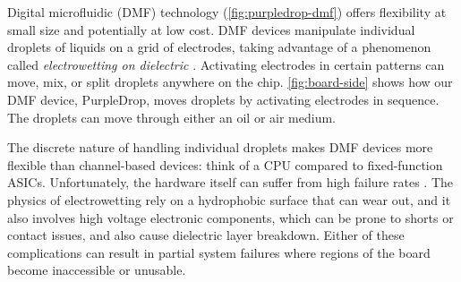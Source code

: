 \documentclass[sigconf, screen]{acmart}
\begin{document}
Digital microfluidic (DMF) technology (\autoref{fig:purpledrop-dmf}) offers flexibility at small size and potentially at low cost.
DMF devices manipulate individual droplets of liquids on a grid of electrodes, taking advantage of a phenomenon called \emph{electrowetting on dielectric} \cite{pollack2000electrowetting}.
Activating electrodes in certain patterns can move, mix, or split droplets anywhere on the chip.
\autoref{fig:board-side} shows how our DMF device, PurpleDrop, moves droplets by activating electrodes in sequence.
The droplets can move through either an oil or air medium.

The discrete nature of handling individual droplets makes DMF devices more flexible than channel-based devices: think of a CPU compared to fixed-function ASICs.
Unfortunately, the hardware itself can suffer from high failure rates \cite{dmf-review}.
The physics of electrowetting rely on a hydrophobic surface that can wear out, and it also involves high voltage electronic components, which can be prone to shorts or contact issues, and also cause dielectric layer breakdown.
Either of these complications can result in partial system failures where regions of the board become inaccessible or unusable.
\end{document}
